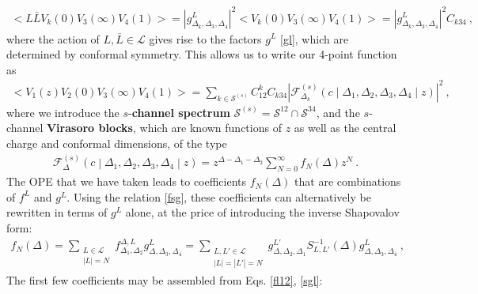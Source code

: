 \documentclass[12pt, a4paper]{article}
\newcommand{\myindex}[1]{\textbf{\boldmath #1}}
\begin{document}
\begin{align}
 \Big<L\bar{L}V_k(0) V_3(\infty)V_4(1)\Big> = \left|g^L_{\Delta_k,\Delta_3,\Delta_4}\right|^2 \Big<V_k(0) V_3(\infty)V_4(1)\Big>=\left|g^L_{\Delta_k,\Delta_3,\Delta_4}\right|^2 C_{k34} \ ,
\end{align}
where the action of $L,\bar L\in\mathcal{L}$ gives rise to the factors $g^L$ \eqref{gl}, which are determined by conformal symmetry. 
This allows us to write our 4-point function as 
\begin{align}
 \boxed{\Big<V_1(z)V_2(0)V_3(\infty)V_4(1)\Big> = \sum_{k\in\mathcal{S}^{(s)}} C_{12}^k C_{k34} \left|\mathcal{F}^{(s)}_{\Delta_k}\left(c\middle|\Delta_1,\Delta_2,\Delta_3,\Delta_4\middle|z\right)\right|^2}  \ ,
 \label{sdec}
\end{align}
where we introduce the $s$-\myindex{channel spectrum} $\mathcal{S}^{(s)}= \mathcal{S}^{12}\cap \mathcal{S}^{34}$, and the $s$-channel \myindex{Virasoro blocks}, which are known functions of $z$ as well as the central charge and conformal dimensions, of the type
\begin{align}
 \mathcal{F}_{\Delta}^{(s)}\left(c\middle|\Delta_1,\Delta_2,\Delta_3,\Delta_4\middle|z\right) =  z^{\Delta-\Delta_1-\Delta_2}\sum_{N=0}^\infty f_N(\Delta)z^N \ .
 \label{fsl}
\end{align}
The OPE that we have taken leads to coefficients $f_N(\Delta)$ that are combinations of $f^L$ and $g^L$. Using the relation \eqref{fsg}, these coefficients can alternatively be rewritten in terms of $g^L$ alone, at the price of introducing the inverse Shapovalov form:
\begin{align}
 f_N(\Delta) = \sum_{\substack{L\in\mathcal{L} \\ |L|=N}} f_{\Delta_1,\Delta_2}^{\Delta,L}g^L_{\Delta,\Delta_3,\Delta_4} = \sum_{\substack{L,L'\in\mathcal{L} \\ |L|=|L'|=N}} g^{L'}_{\Delta,\Delta_2,\Delta_1} S_{L,L'}^{-1}(\Delta) g^L_{\Delta,\Delta_3,\Delta_4} \ ,
 \label{fnd}
\end{align}
The first few coefficients may be assembled from Eqs. \eqref{fl12}, \eqref{sgl}:
\end{document}
